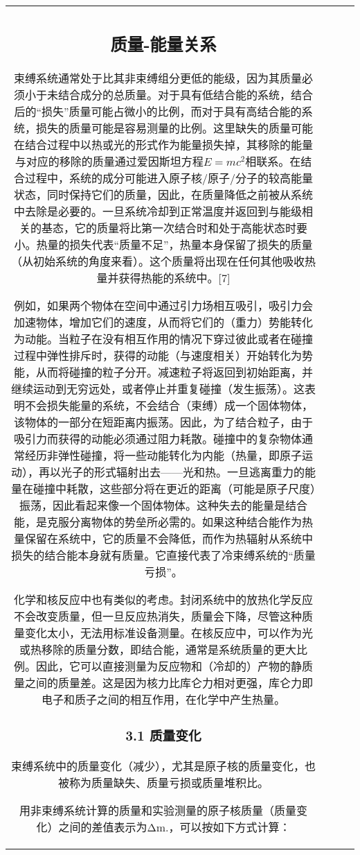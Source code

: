 \begin{table}[ht]
\begin{tabular}{|c|c|c|c}
\subsection{质量-能量关系}
束缚系统通常处于比其非束缚组分更低的能级，因为其质量必须小于未结合成分的总质量。对于具有低结合能的系统，结合后的“损失”质量可能占微小的比例，而对于具有高结合能的系统，损失的质量可能是容易测量的比例。这里缺失的质量可能在结合过程中以热或光的形式作为能量损失掉，其移除的能量与对应的移除的质量通过爱因斯坦方程$E = mc^2$相联系。在结合过程中，系统的成分可能进入原子核/原子/分子的较高能量状态，同时保持它们的质量，因此，在质量降低之前被从系统中去除是必要的。一旦系统冷却到正常温度并返回到与能级相关的基态，它的质量将比第一次结合时和处于高能状态时要小。热量的损失代表“质量不足”，热量本身保留了损失的质量（从初始系统的角度来看）。这个质量将出现在任何其他吸收热量并获得热能的系统中。[7]

例如，如果两个物体在空间中通过引力场相互吸引，吸引力会加速物体，增加它们的速度，从而将它们的（重力）势能转化为动能。当粒子在没有相互作用的情况下穿过彼此或者在碰撞过程中弹性排斥时，获得的动能（与速度相关）开始转化为势能，从而将碰撞的粒子分开。减速粒子将返回到初始距离，并继续运动到无穷远处，或者停止并重复碰撞（发生振荡）。这表明不会损失能量的系统，不会结合（束缚）成一个固体物体，该物体的一部分在短距离内振荡。因此，为了结合粒子，由于吸引力而获得的动能必须通过阻力耗散。碰撞中的复杂物体通常经历非弹性碰撞，将一些动能转化为内能（热量，即原子运动），再以光子的形式辐射出去——光和热。一旦逃离重力的能量在碰撞中耗散，这些部分将在更近的距离（可能是原子尺度）振荡，因此看起来像一个固体物体。这种失去的能量是结合能，是克服分离物体的势垒所必需的。如果这种结合能作为热量保留在系统中，它的质量不会降低，而作为热辐射从系统中损失的结合能本身就有质量。它直接代表了冷束缚系统的“质量亏损”。

化学和核反应中也有类似的考虑。封闭系统中的放热化学反应不会改变质量，但一旦反应热消失，质量会下降，尽管这种质量变化太小，无法用标准设备测量。在核反应中，可以作为光或热移除的质量分数，即结合能，通常是系统质量的更大比例。因此，它可以直接测量为反应物和（冷却的）产物的静质量之间的质量差。这是因为核力比库仑力相对更强，库仑力即电子和质子之间的相互作用，在化学中产生热量。

\subsubsection{3.1 质量变化}
束缚系统中的质量变化（减少），尤其是原子核的质量变化，也被称为质量缺失、质量亏损或质量堆积比。

用非束缚系统计算的质量和实验测量的原子核质量（质量变化）之间的差值表示为Δm.，可以按如下方式计算：


\end{tabular}
\end{table}

